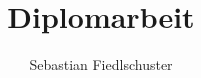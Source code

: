 \documentclass[a4paper]{article}
\title{Diplomarbeit}
\author{Sebastian Fiedlschuster}
\begin{document}
  \maketitle

  \lipsum
\end{document}
